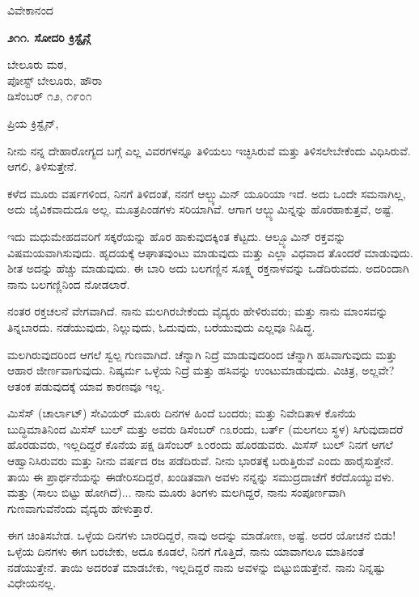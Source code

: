 \begin{flushright}
ವಿವೇಕಾನಂದ
\end{flushright}

\begin{center}
\textbf{೨೧೧. ಸೋದರಿ ಕ್ರಿಸ್ಟೈನ್ಗೆ}
\end{center}

\begin{flushright}
ಬೇಲೂರು ಮಠ,\\ಪೋಸ್ಟ್ ಬೇಲೂರು, ಹೌರಾ\\ಡಿಸೆಂಬರ್ ೧೨, ೧೯೦೧
\end{flushright}

ಪ್ರಿಯ ಕ್ರಿಸ್ಟೈನ್,

ನೀನು ನನ್ನ ದೇಹಾರೋಗ್ಯದ ಬಗ್ಗೆ ಎಲ್ಲ ವಿವರಗಳನ್ನೂ ತಿಳಿಯಲು ಇಚ್ಛಿಸಿರುವೆ ಮತ್ತು ತಿಳಿಸಲೇಬೇಕೆಂದು ವಿಧಿಸಿರುವೆ. ಆಗಲಿ, ತಿಳಿಸುತ್ತೇನೆ.

ಕಳೆದ ಮೂರು ವರ್ಷಗಳಿಂದ, ನಿನಗೆ ತಿಳಿದಂತೆ, ನನಗೆ ಆಲ್ಬ್ಯುಮಿನ್ ಯೂರಿಯಾ ಇದೆ. ಅದು ಒಂದೇ ಸಮನಾಗಿಲ್ಲ, ಅದು ಜೈವಿಕವಾದುದೂ ಅಲ್ಲ. ಮೂತ್ರಪಿಂಡಗಳು ಸರಿಯಾಗಿವೆ. ಆಗಾಗ ಆಲ್ಬ್ಯುಮಿನ್ನನ್ನು ಹೊರಹಾಕುತ್ತವೆ, ಅಷ್ಟೆ.

ಇದು ಮಧುಮೇಹದವರಿಗೆ ಸಕ್ಕರೆಯನ್ನು ಹೊರ ಹಾಕುವುದಕ್ಕಿಂತ ಕೆಟ್ಟದು. ಆಲ್ಬ್ಯೂಮಿನ್ ರಕ್ತವನ್ನು ವಿಷಮಯವಾಗಿಸುವುದು. ಹೃದಯಕ್ಕೆ ಆಘಾತವುಂಟು ಮಾಡುವುದು ಮತ್ತು ಎಲ್ಲಾ ವಿಧವಾದ ತೊಂದರೆ ಮಾಡುವುದು. ಶೀತ ಅದನ್ನು ಹೆಚ್ಚು ಮಾಡುವುದು. ಈ ಬಾರಿ ಅದು ಬಲಗಣ್ಣಿನ ಸೂಕ್ಷ್ಮ ರಕ್ತನಾಳವನ್ನು ಒಡೆದಿರುವದು. ಅದರಿಂದಾಗಿ ನಾನು ಬಲಗಣ್ಣಿನಿಂದ ನೋಡಲಾರೆ.

ನಂತರ ರಕ್ತಚಲನೆ ವೇಗವಾಗಿದೆ. ನಾನು ಮಲಗಿರಬೇಕೆಂದು ವೈದ್ಯರು ಹೇಳಿರುವರು; ಮತ್ತು ನಾನು ಮಾಂಸವನ್ನು ತಿನ್ನಬಾರದು. ನಡೆಯುವುದು, ನಿಲ್ಲುವುದು, ಓದುವುದು, ಬರೆಯುವುದು ಎಲ್ಲವೂ ನಿಷಿದ್ಧ.

ಮಲಗಿರುವುದರಿಂದ ಆಗಲೆ ಸ್ವಲ್ಪ ಗುಣವಾಗಿದೆ. ಚೆನ್ನಾಗಿ ನಿದ್ರೆ ಮಾಡುವುದರಿಂದ ಚೆನ್ನಾಗಿ ಹಸಿವಾಗುವುದು ಮತ್ತು ಆಹಾರ ಜೀರ್ಣವಾಗುವುದು. ನಿಷ್ಕರ್ಮ ಒಳ್ಳೆಯ ನಿದ್ರೆ ಮತ್ತು ಹಸಿವನ್ನು ಉಂಟುಮಾಡುವುದು. ವಿಚಿತ್ರ, ಅಲ್ಲವೇ? ಆತಂಕ ಪಡುವುದಕ್ಕೆ ಯಾವ ಕಾರಣವೂ ಇಲ್ಲ.

ಮಿಸೆಸ್ (ಚಾರ್ಲಾಟ್) ಸೇವಿಯರ್ ಮೂರು ದಿನಗಳ ಹಿಂದೆ ಬಂದರು; ಮತ್ತು ನಿವೇದಿತಾಳ ಕೊನೆಯ ಬುದ್ಧಿಮಾತಿನಿಂದ ಮಿಸೆಸ್ ಬುಲ್ ಮತ್ತು ಅವರು ಡಿಸೆಂಬರ್ ೧೩ರಂದು, ಬರ್ತ್ (ಮಲಗಲು ಸ್ಥಳ) ಸಿಗುವುದಾದರೆ ಹೊರಡುವರು, ಇಲ್ಲದಿದ್ದರೆ ಕೊನೆಯ ಪಕ್ಷ ಡಿಸೆಂಬರ್ ೩೦ರಂದು ಹೊರಡುವರು. ಮಿಸೆಸ್ ಬುಲ್ ನಿನಗೆ ಆಗಲೆ ಆಹ್ವಾನಿಸಿರುವರು ಮತ್ತು ನೀನು ವರ್ಷದ ರಜ ಪಡೆದಿರುವೆ. ನೀನು ಭಾರತಕ್ಕೆ ಬರುತ್ತಿರುವೆ ಎಂದು ಹಾರೈಸುತ್ತೇನೆ. ತಾಯಿ ಈ ಪ್ರಾರ್ಥನೆಯನ್ನು ಈಡೇರಿಸದಿದ್ದರೆ, ಖಂಡಿತವಾಗಿ ಅವಳು ನನ್ನನ್ನು ಸಮುದ್ರದಾಚೆಗೆ ಕರೆದೊಯ್ಯುವಳು. ಮತ್ತು (ಸಾಲು ಬಿಟ್ಟು ಹೋಗಿದೆ)... ನಾನು ಮೂರು ತಿಂಗಳು ಮಲಗಿದ್ದರೆ, ನಾನು ಸಂಪೂರ್ಣವಾಗಿ ಗುಣವಾಗುವೆನೆಂದು ವೈದ್ಯರು ಹೇಳುತ್ತಾರೆ.

ಈಗ ಚಿಂತಿಸಬೇಡ. ಒಳ್ಳೆಯ ದಿನಗಳು ಬಾರದಿದ್ದರೆ, ನಾವು ಅದನ್ನು ಮಾಡೋಣ, ಅಷ್ಟೆ. ಅದರ ಯೋಚನೆ ಬಿಡು! ಒಳ್ಳೆಯ ದಿನಗಳು ಈಗ ಬರಬೇಕು, ಅದೂ ಕೂಡಲೆ, ನಿನಗೆ ಗೊತ್ತಿದೆ, ನಾನು ಯಾವಾಗಲೂ ಮಾತಿನಂತೆ ನಡೆಯುತ್ತೇನೆ. ತಾಯಿ ಅದರಂತೆ ಮಾಡಬೇಕು, ಇಲ್ಲದಿದ್ದರೆ ನಾನು ಅವಳನ್ನು ಬಿಟ್ಟುಬಿಡುತ್ತೇನೆ. ನಾನು ನಿನ್ನಷ್ಟು ವಿಧೇಯನಲ್ಲ.

